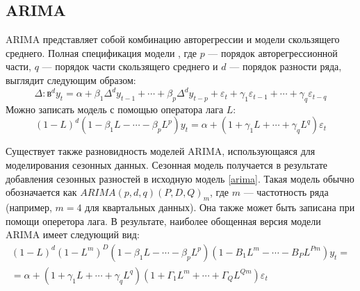 \subsection{ARIMA} \label{sec:arima}
ARIMA представляет собой комбинацию авторегрессии и модели скользящего среднего. Полная спецификация модели , где $p$ --- порядок авторегрессионной части, $q$ --- порядок части скользящего среднего и $d$ --- порядок разности ряда, выглядит следующим образом:
\begin{equation}\label{arima}
\Delta:в^d y_t = \alpha + \beta_1 \Delta^d y_{t-1} + \cdots + \beta_p \Delta^d y_{t-p} + \varepsilon_t + \gamma_1 \varepsilon_{t-1} + \cdots + \gamma_q \varepsilon_{t-q}
\end{equation}
Можно записать модель с помощью оператора лага $L$:\\
 \begin{equation*}
(1-L)^d (1 - \beta_1 L - \cdots - \beta_p L^p)y_t =\alpha + (1 + \gamma_1 L + \cdots + \gamma_q L^q)\varepsilon_t
\end{equation*}

Существует также разновидность моделей ARIMA, использующаяся для моделирования сезонных данных. Сезонная модель получается в результате добавления сезонных разностей в исходную модель \eqref{arima}. Такая модель обычно обозначается как $ARIMA(p,d,q) (P,D,Q)_m$, где $m$ --- частотность ряда (например, $m = 4$ для квартальных данных). Она также может быть записана при помощи оперетора лага. В результате, наиболее обощенная версия модели ARIMA имеет следующий вид:
\begin{align*}
(1-L)^d(1-L^m)^D (1 - \beta_1 L - \cdots - \beta_p L^p)(1-B_1L^m - \cdots - B_P L^{Pm} ) y_t =\\
= \alpha + (1 + \gamma_1 L + \cdots + \gamma_q L^q)(1 + \Gamma_1 L^m + \cdots + \Gamma_Q L^{Qm} ) \varepsilon_t
\end{align*}

